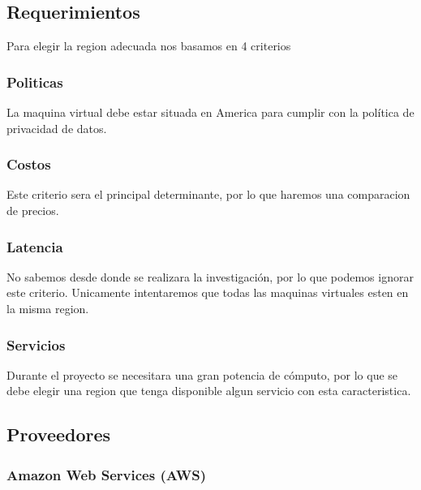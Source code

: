 \documentclass{article}
\begin{document}
\subsection{Requerimientos}
    
Para elegir la region adecuada nos basamos en 4 criterios \cite{choosing_region}
  \subsubsection*{Politicas}
    La maquina virtual debe estar situada en America para cumplir con la política de privacidad de datos.
  \subsubsection*{Costos}
    Este criterio sera el principal determinante, por lo que haremos una comparacion de precios.
  \subsubsection*{Latencia}
    No sabemos desde donde se realizara la investigación, por lo que podemos ignorar este criterio. Unicamente intentaremos que todas las maquinas virtuales esten en la misma region.
  \subsubsection*{Servicios}
    Durante el proyecto se necesitara una gran potencia de cómputo, por lo que se debe elegir una region que tenga disponible algun servicio con esta caracteristica.

  \subsection{Proveedores}

  \subsubsection*{Amazon Web Services (AWS)}
\end{document}

